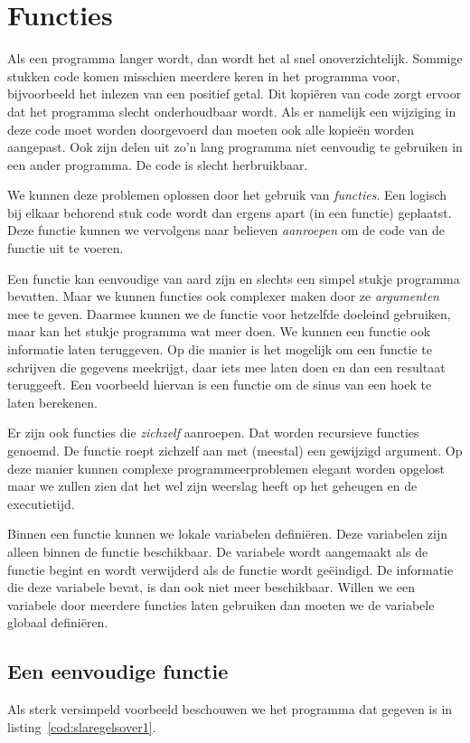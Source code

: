 \chapter{Functies}
\label{cha:functies}
\thispagestyle{empty}

Als een programma langer wordt, dan wordt het al snel onoverzichtelijk. Sommige stukken code komen misschien meerdere keren in het programma voor, bijvoorbeeld het inlezen van een positief getal. Dit kopiëren van code zorgt ervoor dat het programma slecht onderhoudbaar wordt. Als er namelijk een wijziging in deze code moet worden doorgevoerd dan moeten ook alle kopieën worden aangepast. Ook zijn delen uit zo'n lang programma niet eenvoudig te gebruiken in een ander programma. De code is slecht herbruikbaar.

We kunnen deze problemen oplossen door het gebruik van \textsl{functies}. Een logisch bij elkaar behorend stuk code wordt dan ergens apart (in een functie) geplaatst. Deze functie kunnen we vervolgens naar believen \textsl{aanroepen} om de code van de functie uit te voeren.

Een functie kan eenvoudige van aard zijn en slechts een simpel stukje programma bevatten. Maar we kunnen functies ook complexer maken door ze \textsl{argumenten} mee te geven. Daarmee kunnen we de functie voor hetzelfde doeleind gebruiken, maar kan het stukje programma wat meer doen. We kunnen een functie ook informatie laten teruggeven. Op die manier is het mogelijk om een functie te schrijven die gegevens meekrijgt, daar iets mee laten doen en dan een resultaat teruggeeft. Een voorbeeld hiervan is een functie om de sinus van een hoek te laten berekenen.

Er zijn ook functies die \textsl{zichzelf} aanroepen. Dat worden recursieve functies genoemd. De functie roept zichzelf aan met (meestal) een gewijzigd argument. Op deze manier kunnen complexe programmeerproblemen elegant worden opgelost maar we zullen zien dat het wel zijn weerslag heeft op het geheugen en de executietijd.

Binnen een functie kunnen we lokale variabelen definiëren. Deze variabelen zijn alleen binnen de functie beschikbaar. De variabele wordt aangemaakt als de functie begint en wordt verwijderd als de functie wordt geëindigd. De informatie die deze variabele bevat, is dan ook niet meer beschikbaar. Willen we een variabele door meerdere functies laten gebruiken dan moeten we de variabele globaal definiëren.


\section{Een eenvoudige functie}
Als sterk versimpeld voorbeeld beschouwen we het programma dat gegeven is in listing~\ref{cod:slaregelsover1}.

